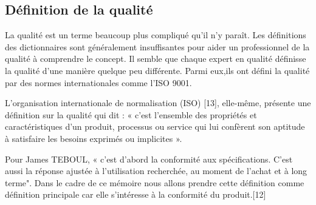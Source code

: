 \subsection{Définition de la qualité}
La qualité est un terme beaucoup plus compliqué qu'il n'y paraît.  Les définitions des dictionnaires sont généralement insuffisantes pour aider un professionnel de la qualité à comprendre le concept.  Il semble que chaque expert en qualité définisse la qualité d'une manière quelque peu différente. Parmi eux,ils ont défini la qualité par des normes internationales comme l’ISO 9001.

L’organisation internationale de normalisation (ISO) [13], elle-même, présente une définition sur la qualité qui dit : « c’est l’ensemble des propriétés et caractéristiques d’un produit, processus ou service qui lui confèrent son aptitude à satisfaire les besoins exprimés ou implicites ».

Pour James TEBOUL, « c’est d’abord la conformité aux spécifications. C’est aussi la réponse ajustée à l’utilisation recherchée, au moment de l’achat et à long terme". Dans le cadre de ce mémoire nous allons prendre cette définition comme définition principale car elle s'intéresse à la conformité du produit.[12]






